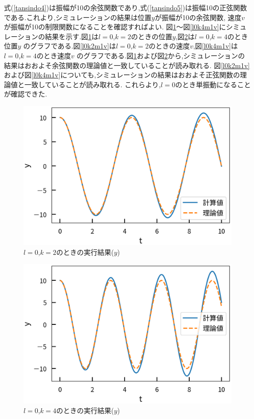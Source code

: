 \documentclass[a4j]{jarticle}
\begin{document}
      式(\ref{tansindo4})は振幅が10の余弦関数であり,式(\ref{tansindo5})は振幅10の正弦関数である.これより,シミュレーションの結果は位置$y$が振幅が10の余弦関数,
      速度$v$が振幅が10の制限関数になることを確認すればよい.
      図\ref{l0k2m1}～図\ref{l0k4m1v}にシミュレーションの結果を示す.図\ref{l0k2m1}は$l=0$,$k=2$のときの位置$y$,図\ref{l0k4m1}は$l=0$,$k=4$のとき位置$y$
      のグラフである.図\ref{l0k2m1v}は$l=0$,$k=2$のときの速度$v$,図\ref{l0k4m1v}は$l=0$,$k=4$のとき速度$v$
      のグラフである.図\ref{l0k2m1}および図\ref{l0k4m1}から,シミュレーションの結果はおおよそ余弦関数の理論値と一致していることが読み取れる.
      図\ref{l0k2m1v}および図\ref{l0k4m1v}についても,シミュレーションの結果はおおよそ正弦関数の理論値と一致していることが読み取れる.
      これらより,$l=0$のとき単振動になることが確認できた.

      \begin{figure}[H]
      \centering
      \includegraphics[scale=0.6]{l0k2.eps}
      \caption{$l=0$,$k=2$のときの実行結果($y$)}
      \label{l0k2m1}
      \end{figure}

      \begin{figure}[H]
        \centering
        \includegraphics[scale=0.6]{l0k4.eps}
        \caption{$l=0$,$k=4$のときの実行結果($y$)}
        \label{l0k4m1}
        \end{figure}
\end{document}
